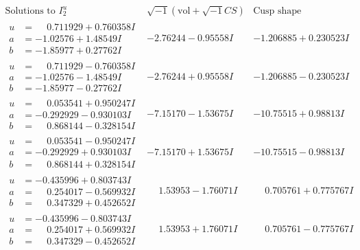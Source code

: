 \documentclass[1p]{elsarticle_modified}
\theoremstyle{definition}
\newcommand{\I}{\sqrt{-1}}
\begin{document}
$$\begin{array}{c|c|c}  
\text{Solutions to }I^u_{2}& \I (\text{vol} + \sqrt{-1}CS) & \text{Cusp shape}\\
 \hline 
\begin{aligned}
u &= \phantom{-}0.711929 + 0.760358 I \\
a &= -1.02576 + 1.48549 I \\
b &= -1.85977 + 0.27762 I\end{aligned}
 & -2.76244 - 0.95558 I & -1.206885 + 0.230523 I \\ \hline\begin{aligned}
u &= \phantom{-}0.711929 - 0.760358 I \\
a &= -1.02576 - 1.48549 I \\
b &= -1.85977 - 0.27762 I\end{aligned}
 & -2.76244 + 0.95558 I & -1.206885 - 0.230523 I \\ \hline\begin{aligned}
u &= \phantom{-}0.053541 + 0.950247 I \\
a &= -0.292929 - 0.930103 I \\
b &= \phantom{-}0.868144 - 0.328154 I\end{aligned}
 & -7.15170 - 1.53675 I & -10.75515 + 0.98813 I \\ \hline\begin{aligned}
u &= \phantom{-}0.053541 - 0.950247 I \\
a &= -0.292929 + 0.930103 I \\
b &= \phantom{-}0.868144 + 0.328154 I\end{aligned}
 & -7.15170 + 1.53675 I & -10.75515 - 0.98813 I \\ \hline\begin{aligned}
u &= -0.435996 + 0.803743 I \\
a &= \phantom{-}0.254017 - 0.569932 I \\
b &= \phantom{-}0.347329 + 0.452652 I\end{aligned}
 & \phantom{-}1.53953 - 1.76071 I & \phantom{-}0.705761 + 0.775767 I \\ \hline\begin{aligned}
u &= -0.435996 - 0.803743 I \\
a &= \phantom{-}0.254017 + 0.569932 I \\
b &= \phantom{-}0.347329 - 0.452652 I\end{aligned}
 & \phantom{-}1.53953 + 1.76071 I & \phantom{-}0.705761 - 0.775767 I \\ \hline\begin{aligned}

\end{aligned}
\end{array}$$
\end{document}
